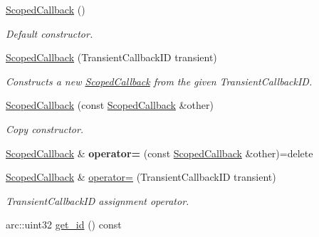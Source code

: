 \begin{DoxyCompactItemize}
\item 
\hyperlink{classsigma_1_1core_1_1_scoped_callback_ab7d6ecc53f4f2ae5c099aa432ca5fe46}{Scoped\-Callback} ()
\begin{DoxyCompactList}\small\item\em Default constructor. \end{DoxyCompactList}\item 
\hyperlink{classsigma_1_1core_1_1_scoped_callback_aa6b342b546577026badad33e7bf521b9}{Scoped\-Callback} (Transient\-Callback\-I\-D transient)
\begin{DoxyCompactList}\small\item\em Constructs a new \hyperlink{classsigma_1_1core_1_1_scoped_callback}{Scoped\-Callback} from the given Transient\-Callback\-I\-D. \end{DoxyCompactList}\item 
\hyperlink{classsigma_1_1core_1_1_scoped_callback_ae39d91862f76b1804acc8edae410678e}{Scoped\-Callback} (const \hyperlink{classsigma_1_1core_1_1_scoped_callback}{Scoped\-Callback} \&other)
\begin{DoxyCompactList}\small\item\em Copy constructor. \end{DoxyCompactList}\item 
\hypertarget{classsigma_1_1core_1_1_scoped_callback_ab0eabc2e0c158643758501f9c6bc444c}{\hyperlink{classsigma_1_1core_1_1_scoped_callback}{Scoped\-Callback} \& {\bfseries operator=} (const \hyperlink{classsigma_1_1core_1_1_scoped_callback}{Scoped\-Callback} \&other)=delete}\label{classsigma_1_1core_1_1_scoped_callback_ab0eabc2e0c158643758501f9c6bc444c}

\item 
\hyperlink{classsigma_1_1core_1_1_scoped_callback}{Scoped\-Callback} \& \hyperlink{classsigma_1_1core_1_1_scoped_callback_a482feda3a077f8c4877a4a56df7eefa3}{operator=} (Transient\-Callback\-I\-D transient)
\begin{DoxyCompactList}\small\item\em Transient\-Callback\-I\-D assignment operator. \end{DoxyCompactList}\item 
\hypertarget{classsigma_1_1core_1_1_scoped_callback_a7db354f147b3e625319f640de420cbbb}{arc\-::uint32 \hyperlink{classsigma_1_1core_1_1_scoped_callback_a7db354f147b3e625319f640de420cbbb}{get\-\_\-id} () const }\label{classsigma_1_1core_1_1_scoped_callback_a7db354f147b3e625319f640de420cbbb}


\end{DoxyCompactItemize}

